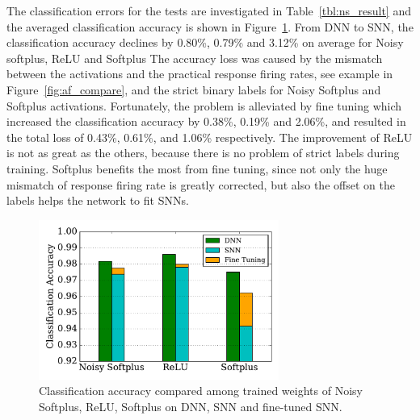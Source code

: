 	The classification errors for the tests are investigated in Table~\ref{tbl:ns_result} and the averaged classification accuracy is shown in Figure~\ref{Fig:result_bar}.
	From DNN to SNN, the classification accuracy declines by 0.80\%, 0.79\% and 3.12\% on average for Noisy softplus, ReLU and Softplus
	The accuracy loss was caused by the mismatch between the activations and the practical response firing rates, see example in Figure~\ref{fig:af_compare}, and the strict binary labels for Noisy Softplus and Softplus activations.
	Fortunately, the problem is alleviated by fine tuning which increased the classification accuracy by 0.38\%, 0.19\% and 2.06\%, and resulted in the total loss of 0.43\%, 0.61\%, and 1.06\% respectively.
	The improvement of ReLU is not as great as the others, because there is no problem of strict labels during training.
	Softplus benefits the most from fine tuning, since not only the huge mismatch of response firing rate is greatly corrected, but also the offset on the labels helps the network to fit SNNs. 
	
	\begin{figure}[hbt!]
		\centering
		\includegraphics[width=0.7\textwidth]{pics_iconip/9-2.pdf}
		\caption{Classification accuracy compared among trained weights of Noisy Softplus, ReLU, Softplus on DNN, SNN and fine-tuned SNN.}
		\label{Fig:result_bar}
	\end{figure}
	
